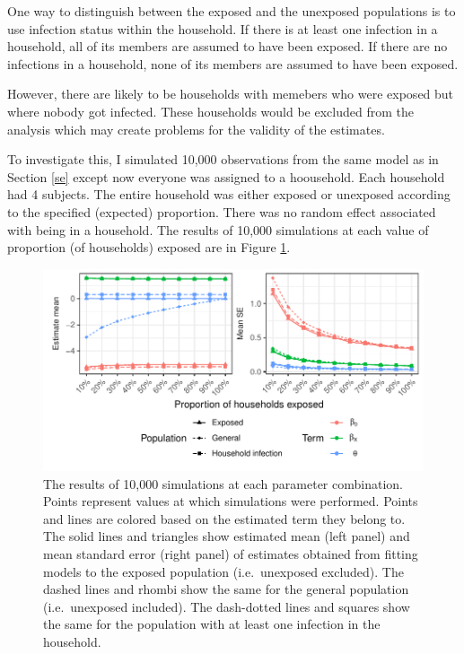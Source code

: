 \documentclass[]{article}
\begin{document}
One way to distinguish between the exposed and the unexposed populations is to use infection status within the household. If there is at least one infection in a household, all of its members are assumed to have been exposed. If there are no infections in a household, none of its members are assumed to have been exposed.

However, there are likely to be households with memebers who were exposed but where nobody got infected. These households would be excluded from the analysis which may create problems for the validity of the estimates.

To investigate this, I simulated 10,000 observations from the same model as in Section \ref{se} except now everyone was assigned to a hoousehold. Each household had 4 subjects. The entire household was either exposed or unexposed according to the specified (expected) proportion. There was no random effect associated with being in a household. The results of 10,000 simulations at each value of proportion (of households) exposed are in Figure \ref{fig:plot3}.



\begin{figure}

{\centering \includegraphics{sim-plot/plot3} 

}

\caption{The results of 10,000 simulations at each parameter combination. Points represent values at which simulations were performed. Points and lines are colored based on the estimated term they belong to. The solid lines and triangles show estimated mean (left panel) and mean standard error (right panel) of estimates obtained from fitting models to the exposed population (i.e.~unexposed excluded). The dashed lines and rhombi show the same for the general population (i.e.~unexposed included). The dash-dotted lines and squares show the same for the population with at least one infection in the household.}\label{fig:plot3}
\end{figure}
\end{document}
